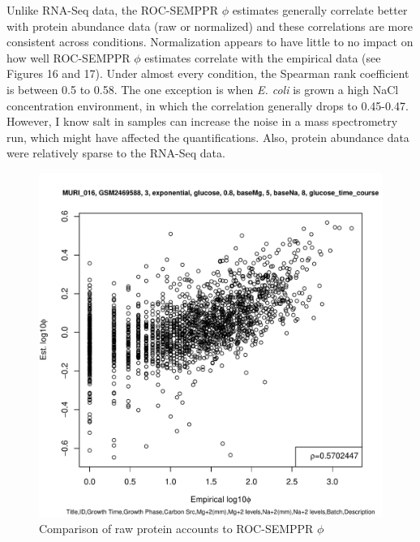 \documentclass[11pt]{labbook}
\begin{document}
Unlike RNA-Seq data, the ROC-SEMPPR $\phi$ estimates generally correlate better with protein abundance data (raw or normalized) and these correlations are more consistent across conditions. Normalization appears to have little to no impact on how well ROC-SEMPPR $\phi$ estimates correlate with the empirical data (see Figures 16 and 17). Under almost every condition, the Spearman rank coefficient is between 0.5 to 0.58. The one exception is when \textit{E. coli} is grown a high NaCl concentration environment, in which the correlation generally drops to 0.45-0.47. However, I know salt in samples can increase the noise in a mass spectrometry run, which might have affected the quantifications. Also, protein abundance data were relatively sparse to the RNA-Seq data.   

\begin{figure}[H]
\centering
\includegraphics[page=1,scale=0.6]{Ecoli_REL606/GSE94117_protein_raw_counts.pdf}
\caption{Comparison of raw protein accounts to ROC-SEMPPR $\phi$}
\end{figure}
\end{document}

